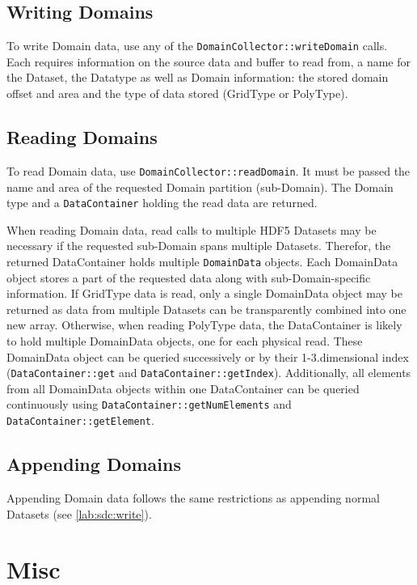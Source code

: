 \documentclass[a4paper,10pt,BCOR12mm]{report}
\begin{document}
\section{Writing Domains}

To write Domain data, use any of the \texttt{DomainCollector::writeDomain} calls.
Each requires information on the source data and buffer to read from, a name for the Dataset, the Datatype as well as
Domain information: the stored domain offset and area and the type of data stored (GridType or PolyType).

\section{Reading Domains}

To read Domain data, use \texttt{DomainCollector::readDomain}.
It must be passed the name and area of the requested Domain partition (sub-Domain).
The Domain type and a \texttt{DataContainer} holding the read data are returned.

When reading Domain data, read calls to multiple HDF5 Datasets may be necessary if the requested
sub-Domain spans multiple Datasets. Therefor, the returned DataContainer holds multiple
\texttt{DomainData} objects.
Each DomainData object stores a part of the requested data along with sub-Domain-specific information.
If GridType data is read, only a single DomainData object may be returned as data from multiple Datasets can
be transparently combined into one new array.
Otherwise, when reading PolyType data, the DataContainer is likely to hold multiple DomainData objects, one for
each physical read.
These DomainData object can be queried successively or by their 1-3.dimensional index (\texttt{DataContainer::get} and \texttt{DataContainer::getIndex}).
Additionally, all elements from all DomainData objects within one DataContainer can be queried continuously using \texttt{DataContainer::getNumElements} and
\texttt{DataContainer::getElement}.

\section{Appending Domains}

Appending Domain data follows the same restrictions as appending normal Datasets (see \ref{lab:sdc:write}).


\chapter{Misc}
\end{document}
